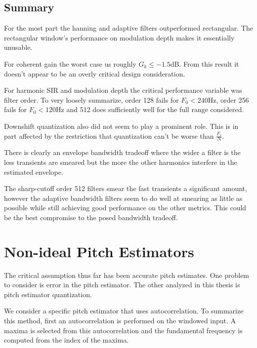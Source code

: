 \documentclass [11pt, proquest,oneside] {ganter_thesis}[2015/03/03]
\begin{document}
\clearpage

\subsection{Summary}

For the most part the hanning and adaptive filters outperformed rectangular.  The rectangular window's performance on modulation depth makes it essentially unusable.

For coherent gain the worst case us roughly $G_k \leq -1.5$dB.  From this result it doesn't appear to be an overly critical design consideration.

For harmonic SIR and modulation depth the critical performance variable was filter order.  To very loosely summarize, order 128 fails for $F_0 < 240$Hz, order 256 fails for $F_0 < 120$Hz and 512 does sufficiently well for the full range considered.

Downshift quantization also did not seem to play a prominent role.  This is in part affected by the restriction that quantization can't be worse than $\frac{F_s}{N}$.

There is clearly an envelope bandwidth tradeoff where the wider a filter is the less transients are smeared but the more the other harmonics interfere in the estimated envelope.

The sharp-cutoff order 512 filters smear the fast transients a significant amount, however the adaptive bandwidth filters seem to do well at smearing as little as possible while still achieving good performance on the other metrics.  This could be the best compromise to the posed bandwidth tradeoff.



\section{Non-ideal Pitch Estimators}

The critical assumption thus far has been accurate pitch estimates.  One problem to consider is error in the pitch estimator.  The other analyzed in this thesis is pitch estimator quantization.

We consider a specific pitch estimator that uses autocorrelation.  To summarize this method, first an autocorrelation is performed on the windowed input.  A maxima is selected from this autocorrelation and the fundamental frequency is computed from the index of the maxima.
\end{document}
